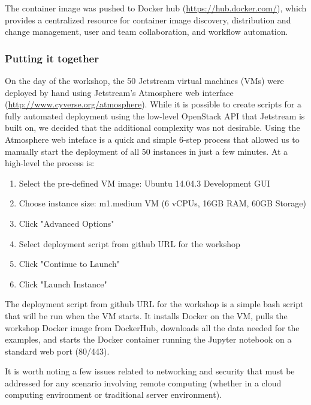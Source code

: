 The container image was pushed to Docker hub (\url{https://hub.docker.com/}),
which provides a centralized resource for container image discovery,
distribution and change management, user and team collaboration, and workflow
automation.

\subsubsection{Putting it together}

 

On the day of the workshop, the 50 Jetstream virtual machines (VMs) were
deployed by hand using Jetstream's Atmosphere web interface
(\url{http://www.cyverse.org/atmosphere}). While it is possible to create
scripts for a fully automated deployment using the low-level OpenStack API that
Jetstream is built on, we decided that the additional complexity was not
desirable. Using the Atmosphere web inteface is a quick and simple 6-step
process that allowed us to manually start the deployment of all 50 instances in
just a few minutes. At a high-level the process is:

\begin{enumerate}
\item Select the pre-defined VM image: Ubuntu 14.04.3 Development GUI
\item Choose instance size: m1.medium VM (6 vCPUs, 16GB RAM, 60GB
  Storage)
\item Click "Advanced Options"
\item Select deployment script from github URL for the workshop
\item Click "Continue to Launch"
\item Click "Launch Instance"
\end{enumerate}

The deployment script from github URL for the workshop is a simple bash script
that will be run when the VM starts. It installs Docker on the VM, pulls the
workshop Docker image from DockerHub, downloads all the data needed for the
examples, and starts the Docker container running the Jupyter notebook on a
standard web port (80/443).

It is worth noting a few issues related to networking and security that must be
addressed for any scenario involving remote computing (whether in a cloud
computing environment or traditional server environment).

